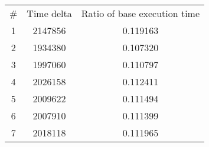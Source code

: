 \begin{tabular}{ccc}
\# & Time delta & Ratio of base execution time\\
1 & 2147856 & 0.119163 \\
2 & 1934380 & 0.107320 \\
3 & 1997060 & 0.110797 \\
4 & 2026158 & 0.112411 \\
5 & 2009622 & 0.111494 \\
6 & 2007910 & 0.111399 \\
7 & 2018118 & 0.111965 \\
\end{tabular}

